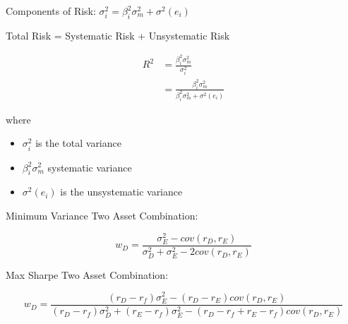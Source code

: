 \documentclass{article}
\begin{document}
Components of Risk: $ \sigma^2_i = \beta^2_i\sigma^2_m + \sigma^2(e_i) $

Total Risk = Systematic Risk + Unsystematic Risk

\begin{align*}
    R^2 
    &= \frac{\beta^2_i\sigma^2_m}{\sigma^2_i} \\
    &= \frac{\beta^2_i\sigma^2_m}{\beta^2_i\sigma^2_m + \sigma^2(e_i)}
\end{align*}

where
\begin{itemize}

    \item $ \sigma^2_i $ is the total variance

    \item $ \beta^2_i\sigma^2_m $ systematic variance

    \item $ \sigma^2(e_i) $ is the unsystematic variance

\end{itemize}

Minimum Variance Two Asset Combination:

\[
    w_D = \frac
        {\sigma^2_E - cov(r_D, r_E)}
        {\sigma^2_D + \sigma^2_E - 2cov(r_D, r_E)}
\]

Max Sharpe Two Asset Combination:

\[
    w_D = \frac
        {(r_D - r_f)\sigma^2_E - (r_D - r_E)cov(r_D, r_E)}
        {(r_D - r_f)\sigma^2_D + (r_E - r_f)\sigma^2_E - (r_D - r_f + r_E - r_f)cov(r_D, r_E)}
\]
\end{document}
